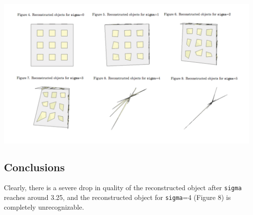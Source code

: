 \documentclass{article}
\begin{document}
\begin{center}
	\includegraphics[width=\textwidth,keepaspectratio]{reconstructed_objects.png}


\end{center}


\subsection{Conclusions}

Clearly, there is a severe drop in quality of the reconstructed object after \texttt{sigma} reaches around 3.25, and the reconstructed object for \texttt{sigma}=4 (Figure 8) is completely unrecognizable.
\end{document}
